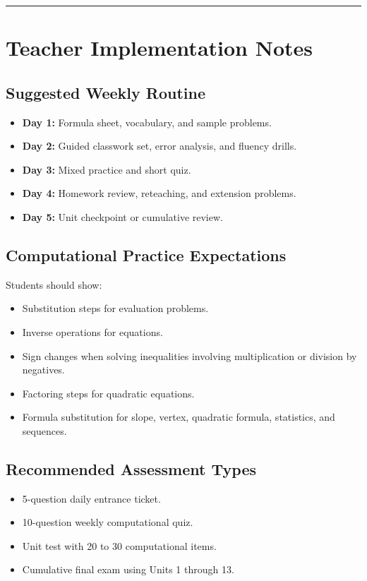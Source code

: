 \documentclass[11pt]{book}
\begin{document}
\bigskip\hrule\bigskip

\chapter{Teacher Implementation Notes}

\section{Suggested Weekly Routine}

\begin{itemize}
\item \textbf{Day 1:} Formula sheet, vocabulary, and sample problems.
\item \textbf{Day 2:} Guided classwork set, error analysis, and fluency drills.
\item \textbf{Day 3:} Mixed practice and short quiz.
\item \textbf{Day 4:} Homework review, reteaching, and extension problems.
\item \textbf{Day 5:} Unit checkpoint or cumulative review.
\end{itemize}

\section{Computational Practice Expectations}

Students should show:

\begin{itemize}
\item Substitution steps for evaluation problems.
\item Inverse operations for equations.
\item Sign changes when solving inequalities involving multiplication or division by negatives.
\item Factoring steps for quadratic equations.
\item Formula substitution for slope, vertex, quadratic formula, statistics, and sequences.
\end{itemize}

\section{Recommended Assessment Types}

\begin{itemize}
\item 5-question daily entrance ticket.
\item 10-question weekly computational quiz.
\item Unit test with 20 to 30 computational items.
\item Cumulative final exam using Units 1 through 13.
\end{itemize}
\end{document}
